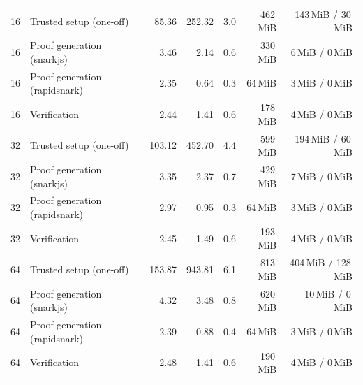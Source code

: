 \begin{table}[t]
{\begin{tabular}{|r|l|r|r|r|r|r|}
16 & Trusted setup (one-off) & 85.36 & 252.32 & 3.0 & 462\,MiB & 143\,MiB / 30\,MiB \\
16 & Proof generation (snarkjs) & 3.46 & 2.14 & 0.6 & 330\,MiB & 6\,MiB / 0\,MiB \\
16 & Proof generation (rapidsnark) & 2.35 & 0.64 & 0.3 & 64\,MiB & 3\,MiB / 0\,MiB \\
16 & Verification & 2.44 & 1.41 & 0.6 & 178\,MiB & 4\,MiB / 0\,MiB \\
\hline
32 & Trusted setup (one-off) & 103.12 & 452.70 & 4.4 & 599\,MiB & 194\,MiB / 60\,MiB \\
32 & Proof generation (snarkjs) & 3.35 & 2.37 & 0.7 & 429\,MiB & 7\,MiB / 0\,MiB \\
32 & Proof generation (rapidsnark) & 2.97 & 0.95 & 0.3 & 64\,MiB & 3\,MiB / 0\,MiB \\
32 & Verification & 2.45 & 1.49 & 0.6 & 193\,MiB & 4\,MiB / 0\,MiB \\
\hline
64 & Trusted setup (one-off) & 153.87 & 943.81 & 6.1 & 813\,MiB & 404\,MiB / 128\,MiB \\
64 & Proof generation (snarkjs) & 4.32 & 3.48 & 0.8 & 620\,MiB & 10\,MiB / 0\,MiB \\
64 & Proof generation (rapidsnark) & 2.39 & 0.88 & 0.4 & 64\,MiB & 3\,MiB / 0\,MiB \\
64 & Verification & 2.48 & 1.41 & 0.6 & 190\,MiB & 4\,MiB / 0\,MiB \\
\hline
\end{tabular}}
\end{table}
